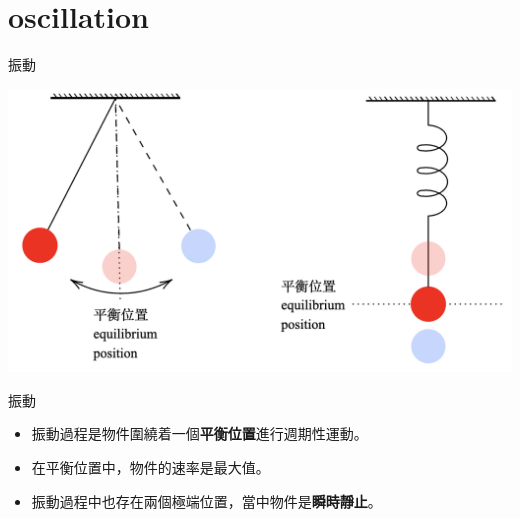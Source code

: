 \documentclass[beamer=true]{standalone}
\begin{document}

\section{oscillation}
\begin{frame}{振動}
    \par{\par\centering\includegraphics[width=\textwidth]{./img/ch1_2024-05-03-16-54-14.png}\par}
\end{frame}

\begin{frame}{振動}
    \begin{itemize}
        \item 振動過程是物件圍繞着一個\textbf{平衡位置}進行週期性運動。
        \item 在平衡位置中，物件的速率是最大值。
        \item 振動過程中也存在兩個極端位置，當中物件是\textbf{瞬時靜止}。
    \end{itemize}
\end{frame}
\end{document}
